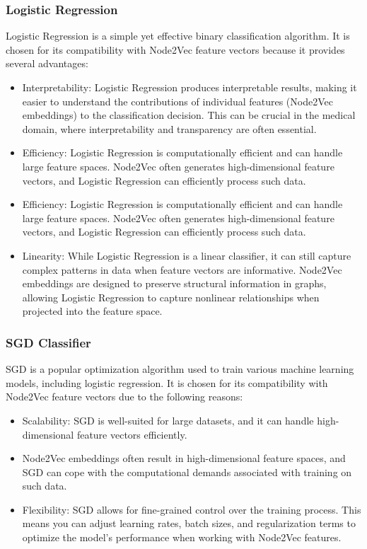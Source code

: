 \documentclass[journal,transmag]{J-NaNA}
\begin{document}
\subsubsection{Logistic Regression}

Logistic Regression is a simple yet effective binary classification algorithm. It is chosen for its compatibility with Node2Vec feature vectors because it provides several advantages:
\begin{itemize}
    \item Interpretability: Logistic Regression produces interpretable results, making it easier to understand the contributions of individual features (Node2Vec embeddings) to the classification decision. This can be crucial in the medical domain, where interpretability and transparency are often essential.
    \item Efficiency: Logistic Regression is computationally efficient and can handle large feature spaces. Node2Vec often generates high-dimensional feature vectors, and Logistic Regression can efficiently process such data.
    \item Efficiency: Logistic Regression is computationally efficient and can handle large feature spaces. Node2Vec often generates high-dimensional feature vectors, and Logistic Regression can efficiently process such data.
    \item Linearity: While Logistic Regression is a linear classifier, it can still capture complex patterns in data when feature vectors are informative. Node2Vec embeddings are designed to preserve structural information in graphs, allowing Logistic Regression to capture nonlinear relationships when projected into the feature space.
\end{itemize}

\subsubsection{SGD Classifier}
SGD is a popular optimization algorithm used to train various machine learning models, including logistic regression. It is chosen for its compatibility with Node2Vec feature vectors due to the following reasons:
\begin{itemize}
    \item Scalability: SGD is well-suited for large datasets, and it can handle high-dimensional feature vectors efficiently. \item Node2Vec embeddings often result in high-dimensional feature spaces, and SGD can cope with the computational demands associated with training on such data.
    \item Flexibility: SGD allows for fine-grained control over the training process. This means you can adjust learning rates, batch sizes, and regularization terms to optimize the model's performance when working with Node2Vec features.
\end{itemize}
\end{document}
